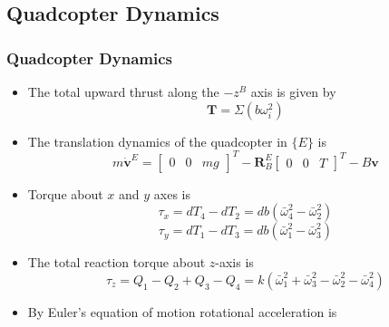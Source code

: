 \documentclass[10pt]{beamer}
\begin{document}
\subsection*{Quadcopter Dynamics}
\begin{frame}
	\frametitle{Quadcopter Dynamics}
	\begin{itemize}
		\item The total upward thrust along the $-z^{B}$ axis is given by
		      \begin{equation}
			      \mathbf{T} = \Sigma (b {\omega}_{i}^2)
		      \end{equation}
		\pause
		\vspace*{-0.3 cm}
		\item The translation dynamics of the quadcopter in $\{E\}$ is
		      \begin{equation}
			      m\dot{\mathbf{v}}^{E}=\begin{bmatrix}
				      0 & 0 & m g
			      \end{bmatrix}^{T}-\mathbf{R}_{B}^{E}\begin{bmatrix}
				      0 & 0 & T
			      \end{bmatrix}^{T} - B\mathbf{v}\label{eq:trans_dynamics}
		      \end{equation}
			  \pause
			  \vspace*{-0.3 cm}
		\item Torque about $x$ and $y$ axes is
		      \begin{equation}
			      \tau_{x}=d T_{4}-d T_{2} = db(\bar{\omega}_{4}^{2}-\bar{\omega}_{2}^{2})
		      \end{equation}
		      \begin{equation}
			      \tau_{y}=d T_{1}-d T_{3} = db(\bar{\omega}_{1}^{2}-\bar{\omega}_{3}^{2})
		      \end{equation}
			  \pause
			  \vspace*{-0.3 cm}
		\item The total reaction torque about $z$-axis is
		      \begin{equation}
			      \tau_{z} =Q_{1}-Q_{2}+Q_{3}-Q_{4}=k\left(\bar{\omega}_{1}^{2}+\bar{\omega}_{3}^{2}-\bar{\omega}_{2}^{2}-\bar{\omega}_{4}^{2}\right)\label{eq:react_torque_z}
		      \end{equation}
			  \pause
			  \vspace*{-0.3 cm}
		\item By Euler's equation of motion rotational acceleration is
		      \begin{equation}

\end{equation}
\end{itemize}
\end{frame}
\end{document}
